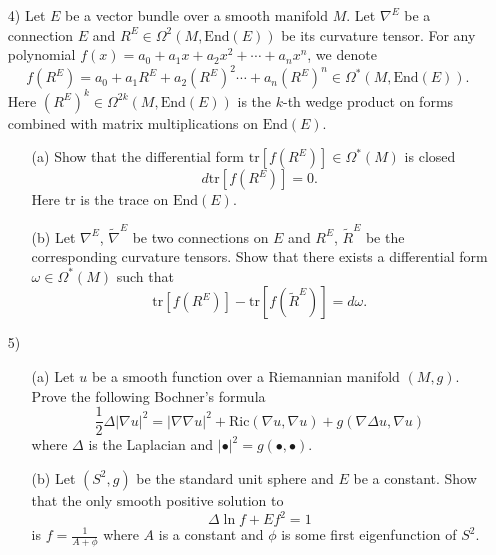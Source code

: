 \documentclass[10pt]{article}
\begin{document}
\begin{enumerate}
\item [4)]  Let $E$ be a vector bundle over a smooth manifold
$M$. Let $\nabla^E$ be a connection $E$ and $R^E\in \Omega^2(M, \text{End}(E))$ be its curvature tensor. For any polynomial $f(x)=a_0+a_1x+a_2 x^2+\cdots+a_nx^n$, we denote
$$
f(R^E)=a_0+a_1 R^E+ a_2 (R^E)^2\cdots+a_n (R^E)^n \in \Omega^*(M, \text{End}(E)).
$$
Here $(R^E)^k\in \Omega^{2k}(M, \text{End}(E))$ is the $k$-th wedge product on forms combined with matrix multiplications on $\text{End}(E)$.
\begin{enumerate}
\item [(a)] Show that the differential form $\text{tr}\left[ f(R^E)\right]\in \Omega^{*}(M)$ is closed
$$
  d \text{tr}\left[ f(R^E)\right]=0.
$$
Here $\text{tr}$ is the trace on $\text{End}(E)$.
\item [(b)] Let $\nabla^E$, $\widetilde\nabla^E$ be two connections on $E$ and $R^E$, $\widetilde R^E$ be the corresponding
curvature tensors.  Show that  there exists a differential form
$\omega\in\Omega^*(M)$ such that
$$\text{tr}\left[ f(R^E)\right]-\text{tr} \left[f(\tilde R^E)\right]=d\omega.$$
\end{enumerate}
\item [5)]
\begin{enumerate}
\item [(a)] Let $u$ be a smooth function over a Riemannian manifold $(M,g)$.  Prove the following Bochner's formula
$$\frac{1}{2}\Delta|\nabla u|^2=|\nabla\nabla u|^2+\text{Ric}(\nabla u,\nabla u)+g(\nabla\Delta u,\nabla u)$$
where $\Delta$ is the Laplacian and $|\bullet|^2=g(\bullet,
\bullet)$.

\item [(b)] Let $(S^2,g)$ be the standard unit sphere and $E$ be a constant. Show that the only smooth positive solution to
$$\Delta \ln f+Ef^2=1$$ is $f=\frac{1}{A+\phi}$ where $A$ is a
constant and $\phi$ is some first eigenfunction of $S^2$.
\end{enumerate}


\end{enumerate}
\end{document}
